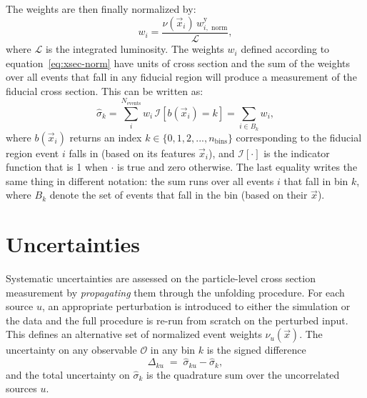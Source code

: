 The weights are then finally normalized by:
\begin{equation}
  \label{eq:xsec-norm}
  w_{i} = \frac{\nu(\vec{x}_i)\,w^\mathrm{y}_{i,\text{ norm}}}{\mathcal{L}},
\end{equation}
where $\mathcal{L}$ is the integrated luminosity.
The weights $w_i$ defined according to equation~\ref{eq:xsec-norm} have units of cross section and the sum of the weights over all events that fall in any fiducial region will produce a measurement of the fiducial cross section.
This can be written as:
\begin{equation}
  \label{eq:fid-xsec}
  \hat{\sigma}_{k} = \sum_{i}^{N_\mathrm{events}}w_{i}\,\mathcal{I}[b(\vec{x}_{i})=k] = \sum_{i\in B_k} w_i,
\end{equation}
where $b(\vec{x}_{i})$ returns an index $k\in\{0,1,2,...,n_\text{bins}\}$ corresponding to the fiducial region event $i$ falls in (based on its features $\vec{x}_i$), and $\mathcal{I}[\cdot]$ is the indicator function that is 1 when $\cdot$ is true and zero otherwise.
The last equality writes the same thing in different notation: the sum runs over all events $i$ that fall in bin $k$, where $B_k$ denote the set of events that fall in the bin (based on their $\vec{x}$).

\FloatBarrier

\section{Uncertainties}
\label{sec:zjets-uncert}

Systematic uncertainties are assessed on the particle-level cross section measurement by \textit{propagating} them through the unfolding procedure.
For each source $u$, an appropriate perturbation is introduced to either the simulation or the data and the full \Omnifold procedure is re-run from scratch on the perturbed input.
This defines an alternative set of normalized event weights $\nu_u(\vec{x})$.
The uncertainty on any observable $\mathcal{O}$ in any bin $k$ is the signed difference
\begin{equation}
    \Delta_{ku} \;=\; \hat{\sigma}_{ku} - \hat{\sigma}_k,
\end{equation}
and the total uncertainty on $\hat{\sigma}_k$ is the quadrature sum over the uncorrelated sources $u$.

